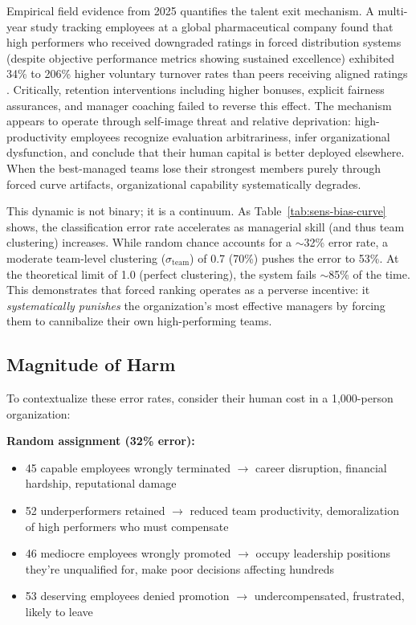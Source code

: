 \documentclass[12pt]{article}
\begin{document}
Empirical field evidence from 2025 quantifies the talent exit mechanism. A multi-year study tracking employees at a global pharmaceutical company found that high performers who received downgraded ratings in forced distribution systems (despite objective performance metrics showing sustained excellence) exhibited 34\% to 206\% higher voluntary turnover rates than peers receiving aligned ratings \citep{informs2025talent}. Critically, retention interventions including higher bonuses, explicit fairness assurances, and manager coaching failed to reverse this effect. The mechanism appears to operate through self-image threat and relative deprivation: high-productivity employees recognize evaluation arbitrariness, infer organizational dysfunction, and conclude that their human capital is better deployed elsewhere. When the best-managed teams lose their strongest members purely through forced curve artifacts, organizational capability systematically degrades.


This dynamic is not binary; it is a continuum. As Table~\ref{tab:sens-bias-curve} shows, the classification error rate accelerates as managerial skill (and thus team clustering) increases. While random chance accounts for a $\sim$32\% error rate, a moderate team-level clustering ($\sigma_{\text{team}}$) of 0.7 (70\%) pushes the error to 53\%.  At the theoretical limit of 1.0 (perfect clustering), the system fails $\sim$85\% of the time. This demonstrates that forced ranking operates as a perverse incentive: it \textit{systematically punishes} the organization's most effective managers by forcing them to cannibalize their own high-performing teams.

\subsection{Magnitude of Harm}

To contextualize these error rates, consider their human cost in a 1,000-person organization:

\textbf{Random assignment (32\% error):}
\begin{itemize}
\item 45 capable employees wrongly terminated $\rightarrow$ career disruption, financial hardship, reputational damage
\item 52 underperformers retained $\rightarrow$ reduced team productivity, demoralization of high performers who must compensate
\item 46 mediocre employees wrongly promoted $\rightarrow$ occupy leadership positions they're unqualified for, make poor decisions affecting hundreds
\item 53 deserving employees denied promotion $\rightarrow$ undercompensated, frustrated, likely to leave
\end{itemize}
\end{document}
